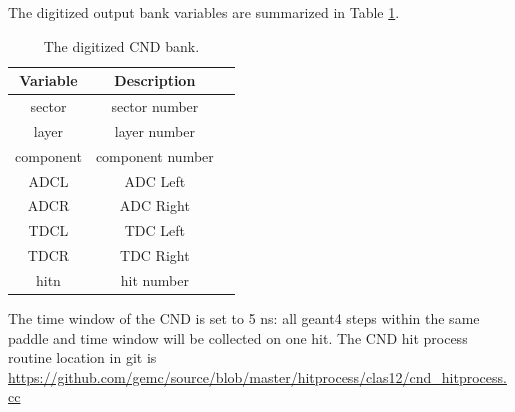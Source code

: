 The digitized output bank variables are summarized in Table \ref{tab:cndBank}.

\begin{table}[h]
	\begin{center}
		\begin{tabular}{| c | c | c |}
			\hline \hline
			Variable  &          Description     \\
			\hline
              sector  &        sector number     \\
               layer  &         layer number     \\
           component  &     component number     \\
                ADCL  &             ADC Left     \\
                ADCR  &            ADC Right     \\
                TDCL  &             TDC Left     \\
                TDCR  &            TDC Right     \\
                hitn  &           hit number     \\
			\hline \hline
		\end{tabular}
	\end{center}
	\caption{The digitized CND bank.}\label{tab:cndBank}
\end{table}


The time window  of the CND is set to 5 ns: all geant4 steps within the same paddle and time window will be collected on one hit.
The CND hit process routine location in git is \url{https://github.com/gemc/source/blob/master/hitprocess/clas12/cnd_hitprocess.cc}
